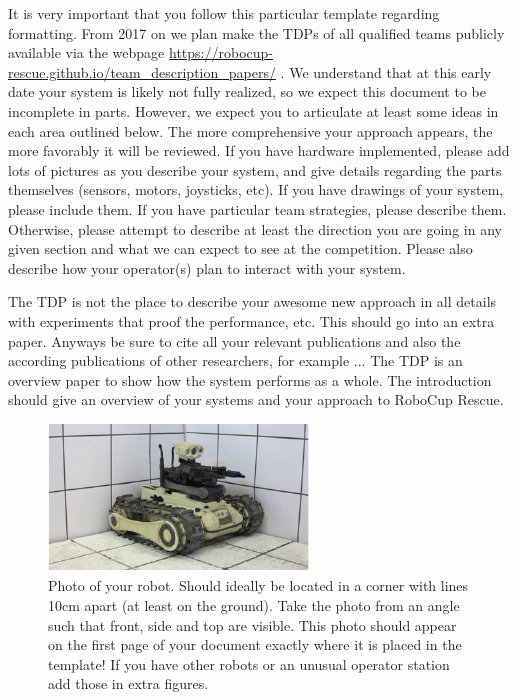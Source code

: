 \documentclass[journal]{IEEEtran}
\begin{document}
It is very important that you follow this particular template regarding formatting. From 2017 on we plan make the TDPs of all qualified teams publicly available via the webpage \url{https://robocup-rescue.github.io/team_description_papers/} . We understand that at this early date your system is likely not fully realized, so we expect this document to be incomplete in parts.  However, we expect you to articulate at least some ideas in each area outlined below.  The more comprehensive your approach appears, the more favorably it will be reviewed. If you have hardware implemented, please add lots of pictures as you describe your system, and give details regarding the parts themselves (sensors, motors, joysticks, etc).  If you have drawings of your system, please include them. If you have particular team strategies, please describe them. Otherwise, please attempt to describe at least the direction you are going in any given section and what we can expect to see at the competition.  Please also describe how your operator(s) plan to interact with your system.

The TDP is not the place to describe your awesome new approach in all details with experiments that proof the performance, etc. This should go into an extra paper. Anyways be sure to cite all your relevant publications and also the according publications of other researchers, for example \cite{Sheh2016RoboCupRescue, sheh2011robocuprescue, lorenz2018robocup, Kohlbrecher_community_ssrr_2012, PellenzMappingAndMapScoring2008, sheh2012advancing, jacoff2012robocup, SSRR11-FiducialMapMetric, SSRR07-JacobsAutonomy}... The TDP is an overview paper to show how the system performs as a whole. The introduction should give an overview of your systems and your approach to RoboCup Rescue.

\begin{figure}[!t]
\centering
\includegraphics[width=\linewidth]{figs/booth}
\caption{Photo of your robot. Should ideally be located in a corner with lines 10cm apart (at least on the ground). Take the photo from an angle such that front, side and top are visible. This photo should appear on the first page of your document exactly where it is placed in the template! If you have other robots or an unusual operator station add those in extra figures.}
\label{fig:robotPhoto}
\end{figure}
\end{document}
